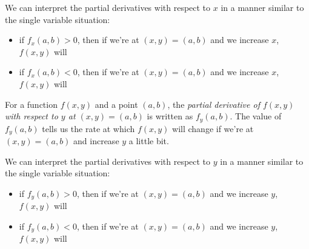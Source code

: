 We can interpret the partial derivatives with respect to $x$ in a manner similar to the single variable situation:
\begin{itemize}
    \item if $f_x(a,b)>0$, then if we're at $(x,y)=(a,b)$ and we increase $x$, $f(x,y)$ will \phantom{increase.}
    \item if $f_x(a,b)<0$, then if we're at $(x,y)=(a,b)$ and we increase $x$, $f(x,y)$ will \phantom{decrease.}
\end{itemize}

\bigskip 

For a function $f(x,y)$ and a point $(a,b)$, the \emph{partial derivative of $f(x,y)$ with respect to $y$ at $(x,y)=(a,b)$} is written as $f_y(a,b)$. The value of $f_y(a,b)$ tells us the rate at which $f(x,y)$ will change if we're at $(x,y)=(a,b)$ and increase $y$ a little bit.

We can interpret the partial derivatives with respect to $y$ in a manner similar to the single variable situation:
\begin{itemize}
    \item if $f_y(a,b)>0$, then if we're at $(x,y)=(a,b)$ and we increase $y$, $f(x,y)$ will \phantom{increase.}
    \item if $f_y(a,b)<0$, then if we're at $(x,y)=(a,b)$ and we increase $y$, $f(x,y)$ will \phantom{decrease.}
\end{itemize}



